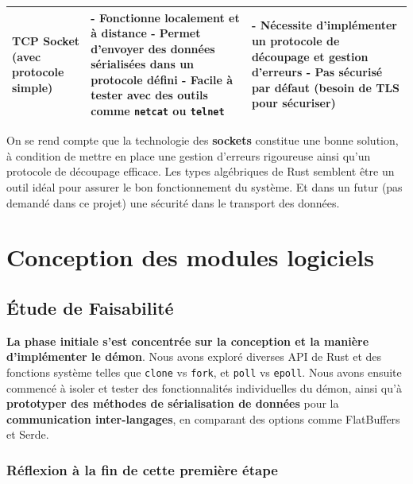 \documentclass{article}
\begin{document}
\begin{table}[H]
\begin{tabularx}{\textwidth}{|l|X|X|}
      \hline
      TCP Socket (avec protocole simple) & 
      - Fonctionne localement et à distance \newline
      - Permet d’envoyer des données sérialisées dans un protocole défini \newline
      - Facile à tester avec des outils comme \texttt{netcat} ou \texttt{telnet} &
      - Nécessite d’implémenter un protocole de découpage et gestion d’erreurs \newline
      - Pas sécurisé par défaut (besoin de TLS pour sécuriser) \\
      \hline
    \end{tabularx}
\end{table}

On se rend compte que la technologie des \textbf{sockets} constitue une bonne solution, à condition de mettre en place une gestion d’erreurs rigoureuse ainsi qu’un protocole de découpage efficace. Les types algébriques de Rust semblent être un outil idéal pour assurer le bon fonctionnement du système. Et dans un futur (pas demandé dans ce projet) une sécurité dans le transport des données.


\section{Conception des modules logiciels}

\subsection{Étude de Faisabilité}

\textbf{La phase initiale s’est concentrée sur la conception et la manière d’implémenter le démon}. Nous avons exploré diverses API de Rust et des fonctions système telles que \texttt{clone} vs \texttt{fork}, et \texttt{poll} vs \texttt{epoll}. Nous avons ensuite commencé à isoler et tester des fonctionnalités individuelles du démon, ainsi qu'à \textbf{prototyper des méthodes de sérialisation de données} pour la \textbf{communication inter-langages}, en comparant des options comme FlatBuffers et Serde.

\subsubsection{Réflexion à la fin de cette première étape}
\end{document}
